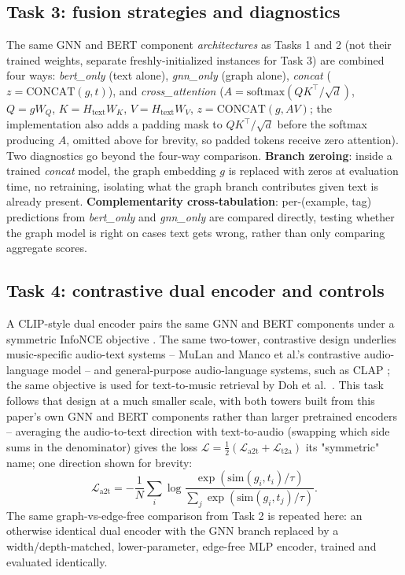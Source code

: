 \subsection{Task 3: fusion strategies and diagnostics}
The same GNN and BERT component \emph{architectures} as Tasks 1 and 2 (not their trained
weights, separate freshly-initialized instances for Task 3) are combined four ways:
\textit{bert\_only} (text alone), \textit{gnn\_only} (graph alone), \textit{concat}
($z=\mathrm{CONCAT}(g,t)$), and \textit{cross\_attention}
($A=\mathrm{softmax}(QK^\top/\sqrt{d})$, $Q=gW_Q$, $K=H_{\mathrm{text}}W_K$,
$V=H_{\mathrm{text}}W_V$, $z=\mathrm{CONCAT}(g, AV)$; the implementation also adds a padding
mask to $QK^\top/\sqrt{d}$ before the softmax producing $A$, omitted above for brevity, so
padded tokens receive zero attention). Two diagnostics go beyond the four-way comparison.
\textbf{Branch zeroing}: inside a trained \textit{concat} model, the graph embedding $g$ is
replaced with zeros at evaluation time, no retraining, isolating what the graph branch
contributes given text is already present. \textbf{Complementarity cross-tabulation}:
per-(example, tag) predictions from \textit{bert\_only} and \textit{gnn\_only} are compared
directly, testing whether the graph model is right on cases text gets wrong, rather than only
comparing aggregate scores.

\subsection{Task 4: contrastive dual encoder and controls}
A CLIP-style \cite{radford2021clip} dual encoder pairs the same GNN and BERT components under
a symmetric InfoNCE objective \cite{oord2018infonce}. The same two-tower, contrastive design
underlies music-specific audio-text systems -- MuLan \cite{huang2022mulan} and Manco et
al.'s contrastive audio-language model \cite{manco2022contrastive} -- and general-purpose
audio-language systems, such as CLAP \cite{elizalde2023clap}; the same objective is used for
text-to-music retrieval by Doh et al.~\cite{doh2023universal}. This task follows that design
at a much smaller scale, with both towers built from this paper's own GNN and BERT components
rather than larger pretrained encoders -- averaging the audio-to-text direction with
text-to-audio (swapping which side sums in the denominator) gives the loss $\mathcal{L} =
\tfrac{1}{2}(\mathcal{L}_{\mathrm{a2t}} + \mathcal{L}_{\mathrm{t2a}})$ its "symmetric" name;
one direction shown for brevity:
\[
\mathcal{L}_{\mathrm{a2t}} = -\frac{1}{N}\sum_i \log\frac{\exp(\mathrm{sim}(g_i,t_i)/\tau)}{\sum_j \exp(\mathrm{sim}(g_i,t_j)/\tau)}.
\]
The same graph-vs-edge-free comparison from Task 2 is repeated here: an otherwise identical
dual encoder with the GNN branch replaced by a width/depth-matched, lower-parameter, edge-free MLP encoder,
trained and evaluated identically.
